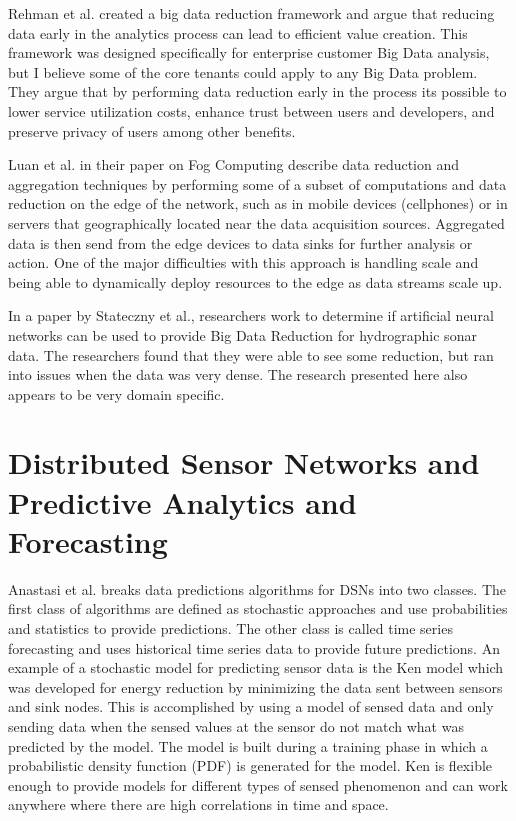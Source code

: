 Rehman et al. created a big data reduction framework\cite{ur2016big} and argue that reducing data early in the analytics process can lead to efficient value creation. This framework was designed specifically for enterprise customer Big Data analysis, but I believe some of the core tenants could apply to any Big Data problem. They argue that by performing data reduction early in the process its possible to lower service utilization costs, enhance trust between users and developers, and preserve privacy of users among other benefits.

Luan et al. in their paper on Fog Computing\cite{luan2015fog} describe data reduction and aggregation techniques by performing some of a subset of computations and data reduction on the edge of the network, such as in mobile devices (cellphones) or in servers that geographically located near the data acquisition sources. Aggregated data is then send from the edge devices to data sinks for further analysis or action. One of the major difficulties with this approach is handling scale and being able to dynamically deploy resources to the edge as data streams scale up.

In a paper by Stateczny et al.\cite{stateczny2014self}, researchers work to determine if artificial neural networks can be used to provide Big Data Reduction for hydrographic sonar data. The researchers found that they were able to see some reduction, but ran into issues when the data was very dense. The research presented here also appears to be very domain specific.

\section{Distributed Sensor Networks and Predictive Analytics and Forecasting}\label{sec:distributed-sensor-networks-and-predictive-analytics-and-forecasting}
Anastasi et al.\cite{anastasi_energy_2009} breaks data predictions algorithms for DSNs into two classes. The first class of algorithms are defined as stochastic approaches and use probabilities and statistics to provide predictions. The other class is called time series forecasting and uses historical time series data to provide future predictions. An example of a stochastic model for predicting sensor data is the Ken model\cite{chu2006approximate} which was developed for energy reduction by minimizing the data sent between sensors and sink nodes. This is accomplished by using a model of sensed data and only sending data when the sensed values at the sensor do not match what was predicted by the model. The model is built during a training phase in which a probabilistic density function (PDF) is generated for the model. Ken is flexible enough to provide models for different types of sensed phenomenon and can work anywhere where there are high correlations in time and space.

